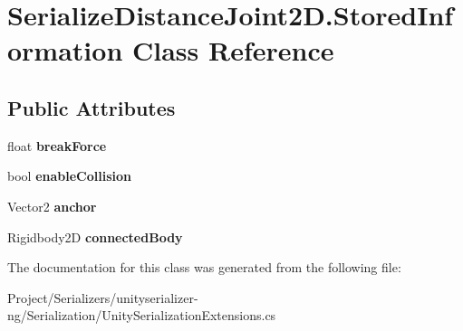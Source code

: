 \hypertarget{class_serialize_distance_joint2_d_1_1_stored_information}{}\section{Serialize\+Distance\+Joint2\+D.\+Stored\+Information Class Reference}
\label{class_serialize_distance_joint2_d_1_1_stored_information}
\subsection*{Public Attributes}
\begin{DoxyCompactItemize}
\item 
\mbox{\label{class_serialize_distance_joint2_d_1_1_stored_information_a07a2b3b6133e0bbba82544697847535c}} 
float {\bfseries break\+Force}
\item 
\mbox{\label{class_serialize_distance_joint2_d_1_1_stored_information_ae306bdb9d3a3149698e4a2db0f905f0b}} 
bool {\bfseries enable\+Collision}
\item 
\mbox{\label{class_serialize_distance_joint2_d_1_1_stored_information_a3f04947cc7a1267139be58ce088fea67}} 
Vector2 {\bfseries anchor}
\item 
\mbox{\label{class_serialize_distance_joint2_d_1_1_stored_information_a379a53b2c607fed0362049dac3b1a1c2}} 
Rigidbody2D {\bfseries connected\+Body}
\end{DoxyCompactItemize}


The documentation for this class was generated from the following file\+:\begin{DoxyCompactItemize}
\item 
Project/\+Serializers/unityserializer-\/ng/\+Serialization/Unity\+Serialization\+Extensions.\+cs\end{DoxyCompactItemize}

